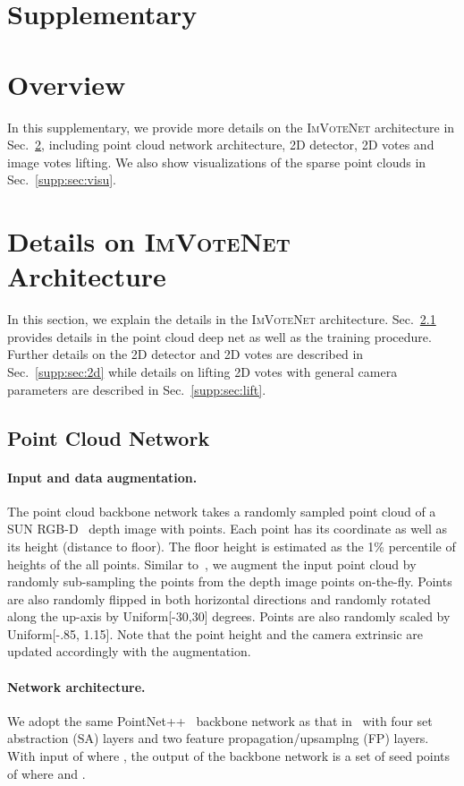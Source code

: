 \documentclass[10pt,twocolumn,letterpaper]{article}
\newcommand{\imvotenet}{\textsc{ImVoteNet}\xspace}
\newcommand{\ours}{\imvotenet}
\begin{document}
\newpage
\clearpage
\appendix
\section*{Supplementary}
\section{Overview}
In this supplementary, we provide more details on the \ours architecture in Sec.~\ref{supp:sec:arch}, including point cloud network architecture, 2D detector, 2D votes and image votes lifting. We also show visualizations of the sparse point clouds in Sec.~\ref{supp:sec:visu}.


\section{Details on \ours Architecture}
\label{supp:sec:arch}
In this section, we explain the details in the \ours architecture. Sec.~\ref{supp:sec:pc} provides details in the point cloud deep net as well as the training procedure. Further details on the 2D detector and 2D votes are described in Sec.~\ref{supp:sec:2d} while details on lifting 2D votes with general camera parameters are described in Sec.~\ref{supp:sec:lift}.

\subsection{Point Cloud Network}
\label{supp:sec:pc}
\paragraph{Input and data augmentation.} The point cloud backbone network takes a randomly sampled point cloud of a SUN RGB-D~\cite{song2015sun} depth image with  points. Each point has its  coordinate as well as its height (distance to floor). The floor height is estimated as the 1\% percentile of heights of the all points.
Similar to~\cite{voteNet}, we augment the input point cloud by randomly sub-sampling the points from the depth image points on-the-fly. Points are also randomly flipped in both horizontal directions and randomly rotated along the up-axis by Uniform[-30,30] degrees. Points are also randomly scaled by Uniform[-.85, 1.15]. Note that the point height and the camera extrinsic are updated accordingly with the augmentation.
\paragraph{Network architecture.} We adopt the same PointNet++~\cite{qi2017pointnetplusplus} backbone network as that in~\cite{voteNet} with four set abstraction (SA) layers and two feature propagation/upsamplng (FP) layers. With input of  where , the output of the backbone network is a set of seed points of  where  and .
\end{document}
